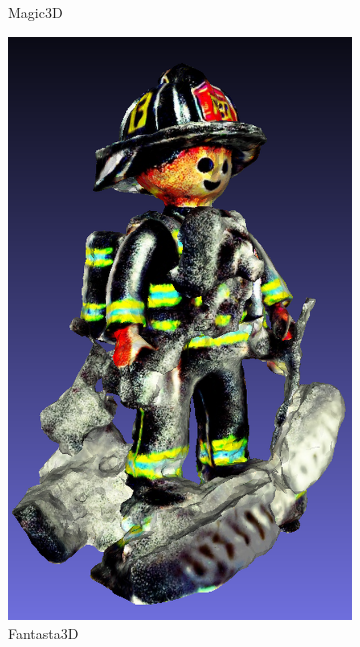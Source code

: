 \begin{figure}[ht]
\begin{subfigure}[b]{0.179\textwidth}
        \caption{Magic3D}
    \end{subfigure}
    \begin{subfigure}[b]{0.227\textwidth}
        \centering
        \includegraphics[width=\textwidth]{figures/subjective/fantasia_playmobil_result_resize.png}
        \caption{Fantasta3D}
    \end{subfigure}
    \begin{subfigure}[b]{0.192\textwidth}
        \centering

\end{subfigure}
\end{figure}
